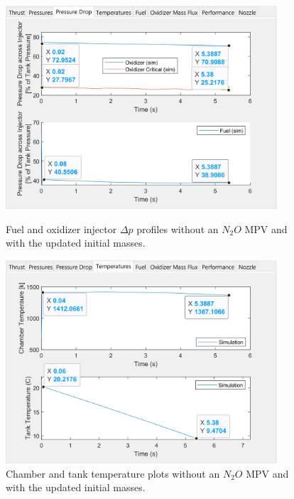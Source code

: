 \documentclass[9pt]{article} %
\numberwithin{equation}{section} %
\begin{document}
\begin{figure}
    \centering
    \begin{minipage}{0.49\textwidth}
        \centering
        \includegraphics[scale=0.5, width=0.9\textwidth, trim={0cm 0cm 0cm 0cm}, clip]{system_sim_files/stanford_final_dp.png} %
        \caption{Fuel and oxidizer injector $\Delta p$ profiles without an $N_{2}O$ MPV and with the updated initial masses.}
        \label{fig:stanford_final_dp}
    \end{minipage}\hfill
    \begin{minipage}{0.49\textwidth}
        \centering
        \includegraphics[scale=0.5, width=0.9\textwidth, trim={0cm 0cm 0cm 0cm}, clip]{system_sim_files/stanford_final_temperatures.png} %
        \caption{Chamber and tank temperature plots without an $N_{2}O$ MPV and with the updated initial masses.}
        \label{fig:stanford_final_temperatures}
    \end{minipage}
\end{figure} 
\end{document}
